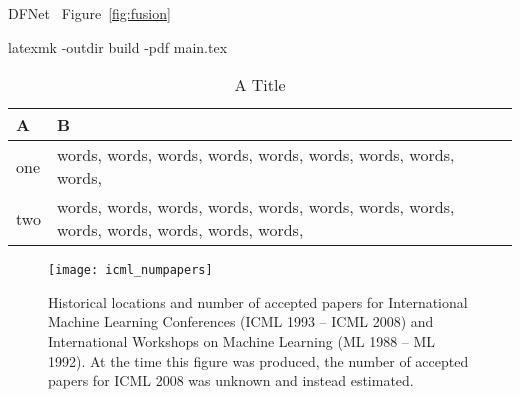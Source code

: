 \usepackage[american]{babel}
\usepackage{microtype}
\graphicspath{{figure/}}

DFNet~\cite{hong2019dfnet}
Figure~\ref{fig:fusion}

\usepackage{amsfonts}

\usepackage{balance}
\balance

latexmk -outdir build -pdf main.tex


\usepackage{xcolor}


\newcommand{\ra}{\textbf{\color{azure(colorwheel)}{R1}}}
\newcommand{\rb}{\textbf{\color{forestgreen(web)}{R2}}}
\newcommand{\rc}{\textbf{\color{awesome}{R3}}}


\begin{table}[t]
    \vskip 0.2in
    \caption{A Title}
    \label{tab:tabularx}
    \begin{center}
        \begin{small}
            \begin{tabularx}{\linewidth}{lX}
                \toprule
                A & B\\
                \midrule
                one & words, words, words, words, words, words, words, words, words,  \\
                two & words, words, words, words, words, words, words, words, words, words, words, words, words, \\
                \bottomrule
            \end{tabularx}
        \end{small}
    \end{center}
    \vskip -0.2in
\end{table}

\begin{figure}[ht]
    \vskip 0.2in
    \begin{center}
        \centerline{\texttt{[image: icml\_numpapers]}}
        \caption{Historical locations and number of accepted papers for International
        Machine Learning Conferences (ICML 1993 -- ICML 2008) and International
        Workshops on Machine Learning (ML 1988 -- ML 1992). At the time this figure was
        produced, the number of accepted papers for ICML 2008 was unknown and instead
        estimated.}
        \label{icml-historical}
    \end{center}
    \vskip -0.2in
\end{figure}


